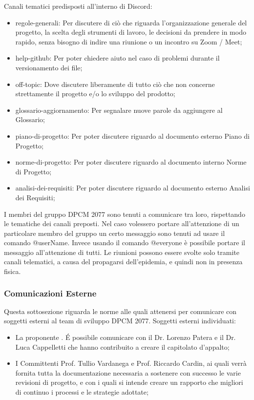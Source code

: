 Canali tematici predisposti all'interno di Discord:
\begin{itemize}
\item{regole-generali: Per discutere di ciò che riguarda l’organizzazione generale del progetto, la scelta degli strumenti di lavoro, le decisioni da prendere in modo rapido, senza bisogno di indire una riunione o un incontro  su Zoom / Meet;}
\item{help-github: Per poter chiedere aiuto nel caso di problemi durante il versionamento dei file;}
\item{off-topic: Dove discutere liberamente di tutto ciò che non concerne strettamente il progetto e/o lo sviluppo del prodotto;}
\item{glossario-aggiornamento: Per segnalare nuove parole da aggiungere al Glossario;}
\item{piano-di-progetto: Per poter discutere riguardo al documento esterno Piano di Progetto;}
\item{norme-di-progetto: Per poter discutere riguardo al documento interno Norme di Progetto;}
\item{analisi-dei-requisiti: Per poter discutere riguardo al documento esterno Analisi dei Requisiti;}
\end{itemize}
I membri del gruppo DPCM 2077 sono tenuti a comunicare tra loro, rispettando le tematiche dei canali preposti. Nel caso volessero portare all’attenzione di un particolare membro del gruppo un certo messaggio sono tenuti ad usare
il comando @userName.
Invece usando il comando @everyone è possibile portare il messaggio all'attenzione di tutti.
Le riunioni possono essere svolte solo tramite canali telematici, a causa del propagarsi dell'epidemia, e quindi non in presenza fisica.

\subsubsection{Comunicazioni Esterne}
Questa sottosezione riguarda le norme alle quali attenersi per comunicare con soggetti esterni al team di sviluppo DPCM 2077.
Soggetti esterni individuati:
\begin{itemize}
\item{La proponente . \'E possibile comunicare con il Dr. Lorenzo Patera e il Dr. Luca Cappelletti che hanno contribuito a creare il capitolato d'appalto;}
\item{I Committenti Prof. Tullio Vardanega e Prof. Riccardo Cardin, ai quali verrà fornita tutta la documentazione necessaria a sostenere con successo le varie revisioni di progetto, e con i quali si intende creare un rapporto che migliori 
di continuo i processi e le strategie adottate;}
\end{itemize}

